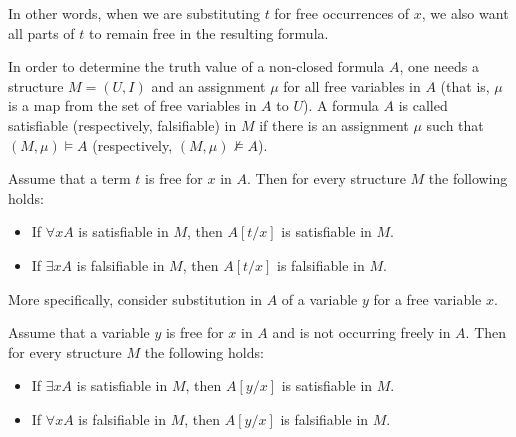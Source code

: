 \begin{page}

In other words, when we are substituting $t$ for free occurrences of $x$,
we also want all parts of $t$ to remain free in the resulting formula.

In order to determine the truth value of a non-closed formula $A$, one needs a structure $M = (U,I)$
and an assignment $\mu$ for all free variables in $A$ (that is, $\mu$ is a map from the set of free variables in $A$ to $U$).
A formula $A$ is called satisfiable (respectively, falsifiable) in $M$
if there is an assignment $\mu$ such that $(M, \mu) \vDash A$ (respectively, $(M, \mu) \not\vDash A$).


\end{page}

\begin{page}

\begin{lem}
\label{lem:TermSubstitute}
Assume that a term $t$ is free for $x$ in $A$.
Then for every structure $M$ the following holds:
\begin{itemize}
\item
If $\forall x A$ is satisfiable in $M$, then $A[t/x]$ is satisfiable in $M$.
\item
If $\exists x A$ is falsifiable in $M$, then $A[t/x]$ is falsifiable in $M$.
\end{itemize}
\end{lem}

\end{page}

\begin{page}


More specifically, consider substitution in $A$ of a variable $y$ for a free variable $x$.


\end{page}

\begin{page}

\begin{lem}
\label{lem:VarSubstitute}
Assume that a variable $y$ is free for $x$ in $A$ and is not occurring freely in $A$.
Then for every structure $M$ the following holds:
\begin{itemize}
\item
If $\exists x A$ is satisfiable in $M$, then $A[y/x]$ is satisfiable in $M$.
\item
If $\forall x A$ is falsifiable in $M$, then $A[y/x]$ is falsifiable in $M$.
\end{itemize}
\end{lem}

\end{page}

